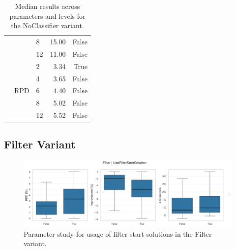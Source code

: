 \begin{table}[!ht]
\begin{tabular}{l l l r r}
		                                               &                                   & 8                     & 15.00           & False           \\\cmidrule(lr){3-5}
		                                               &                                   & 12                    & 11.00           & False           \\\cmidrule(lr){2-5}
		                                               & \multirow[t]{5}{*}{RPD}           & 2                     & 3.34            & True            \\\cmidrule(lr){3-5}
		                                               &                                   & 4                     & 3.65            & False           \\\cmidrule(lr){3-5}
		                                               &                                   & 6                     & 4.40            & False           \\\cmidrule(lr){3-5}
		                                               &                                   & 8                     & 5.02            & False           \\\cmidrule(lr){3-5}
		                                               &                                   & 12                    & 5.52            & False           \\\bottomrule
	\end{tabular}


	\caption{Median results across parameters and levels for the NoClassifier variant.}
	\label{tab:numerical_results_paramStudy_NOclassifiers}
\end{table}
\clearpage
\subsection{Filter Variant}
\label{app:subsec:parameterstudy_Filter}

\begin{figure}[!ht]
	\centering
	\includegraphics[width=\linewidth]{pictures/parameter_study/UseFilterStartSolution_Filter_parameter_study.png}
	\caption{Parameter study for usage of filter start solutions in the Filter variant.}
	\label{fig:parameter_study_filter}
\end{figure}


